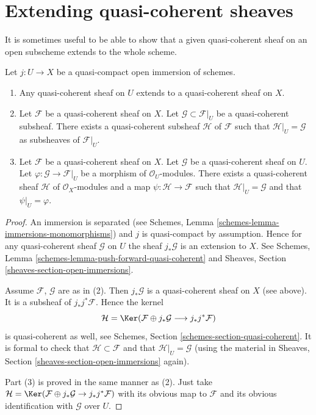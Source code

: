 \section{Extending quasi-coherent sheaves}
\label{section-extending-quasi-coherent-sheaves}

\noindent
It is sometimes useful to be able to show that a given quasi-coherent
sheaf on an open subscheme extends to the whole scheme.

\begin{lemma}
\label{lemma-extend-trivial}
Let $j : U \to X$ be a quasi-compact open immersion of schemes.
\begin{enumerate}
\item Any quasi-coherent sheaf on $U$ extends to a quasi-coherent
sheaf on $X$.
\item Let $\mathcal{F}$ be a quasi-coherent sheaf on $X$.
Let $\mathcal{G} \subset \mathcal{F}|_U$ be a quasi-coherent
subsheaf. There exists a quasi-coherent subsheaf $\mathcal{H}$ of
$\mathcal{F}$ such that $\mathcal{H}|_U = \mathcal{G}$
as subsheaves of $\mathcal{F}|_U$.
\item Let $\mathcal{F}$ be a quasi-coherent sheaf on $X$.
Let $\mathcal{G}$ be a quasi-coherent sheaf on $U$.
Let $\varphi : \mathcal{G} \to \mathcal{F}|_U$ be a morphism
of $\mathcal{O}_U$-modules. There exists a quasi-coherent sheaf $\mathcal{H}$
of $\mathcal{O}_X$-modules and a map $\psi : \mathcal{H} \to \mathcal{F}$
such that $\mathcal{H}|_U = \mathcal{G}$ and that
$\psi|_U = \varphi$.
\end{enumerate}
\end{lemma}

\begin{proof}
An immersion is separated
(see Schemes, Lemma \ref{schemes-lemma-immersions-monomorphisms})
and $j$ is quasi-compact by assumption.
Hence for any quasi-coherent sheaf $\mathcal{G}$ on $U$ the sheaf
$j_*\mathcal{G}$ is an extension to $X$. See
Schemes, Lemma \ref{schemes-lemma-push-forward-quasi-coherent} and
Sheaves, Section \ref{sheaves-section-open-immersions}.

\medskip\noindent
Assume $\mathcal{F}$, $\mathcal{G}$ are as in (2).
Then $j_*\mathcal{G}$ is a quasi-coherent sheaf on $X$ (see above).
It is a subsheaf of $j_*j^*\mathcal{F}$.
Hence the kernel
$$
\mathcal{H} =
\Ker(\mathcal{F} \oplus j_* \mathcal{G}
\longrightarrow j_*j^*\mathcal{F})
$$
is quasi-coherent as well, see
Schemes, Section \ref{schemes-section-quasi-coherent}.
It is formal to check that $\mathcal{H} \subset \mathcal{F}$ and that
$\mathcal{H}|_U = \mathcal{G}$ (using the material in
Sheaves, Section \ref{sheaves-section-open-immersions} again).

\medskip\noindent
Part (3) is proved in the same manner as (2). Just take
$\mathcal{H} = \Ker(\mathcal{F} \oplus j_* \mathcal{G}
\to j_*j^*\mathcal{F})$ with its obvious map to $\mathcal{F}$
and its obvious identification with $\mathcal{G}$ over $U$.
\end{proof}

